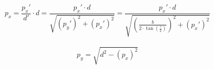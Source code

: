 		
		\begin{equation}
			p_x=\frac{{p_x}'}{d'}\cdot d=\frac{{p_x}'\cdot d}{\sqrt{({p_y}')^2+({p_x}')^2}}=\frac{{p_x}'\cdot d}{\sqrt{\left(\frac{b}{2\cdot \tan(\frac{\gamma}{2})}\right)^2+({p_x}')^2}}
			\label{eq: final}
		\end{equation}\\
	
		\begin{equation}
			p_y=\sqrt{d^2-(p_x)^2}
			\label{eq: ypos}
		\end{equation}
		
	
		
	
		
			
	
		


	     
	

